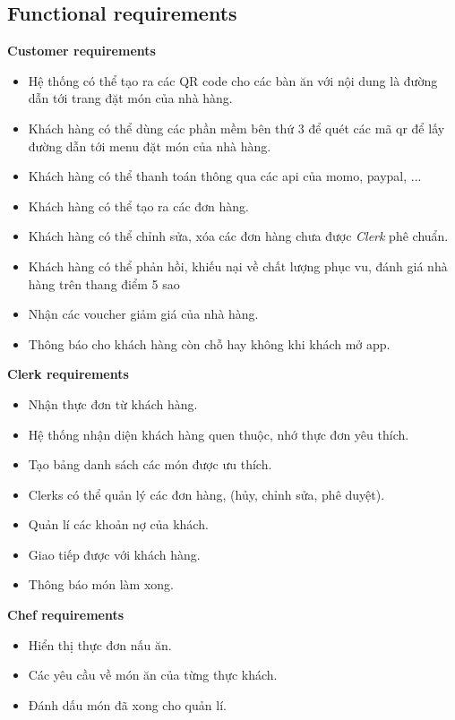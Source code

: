 \documentclass[a4paper]{article}
\begin{document}

\subsection{Functional requirements}

\textbf{Customer requirements}
\begin{itemize}

    \item Hệ thống có thể tạo ra các QR code cho các bàn ăn với nội dung là đường dẫn tới trang đặt món của nhà hàng.
    \item Khách hàng có thể dùng các phần mềm bên thứ 3 để quét các mã qr để lấy đường dẫn tới menu đặt món của nhà hàng.
    \item Khách hàng có thể thanh toán thông qua các api của momo, paypal, ...
    \item Khách hàng có thể tạo ra các đơn hàng.
    \item Khách hàng có thể chỉnh sửa, xóa các đơn hàng chưa được \textit{Clerk} phê chuẩn.
    \item Khách hàng có thể phản hồi, khiếu nại về chất lượng phục vu, đánh giá nhà hàng trên thang điểm 5 sao
    \item Nhận các voucher giảm giá của nhà hàng.
    \item Thông báo cho khách hàng còn chỗ hay không khi khách mở app.
    
\end{itemize}
\textbf{Clerk requirements}
\begin{itemize}
    \item Nhận thực đơn từ khách hàng.
    \item Hệ thống nhận diện khách hàng quen thuộc, nhớ thực đơn yêu thích.
    \item Tạo bảng danh sách các món được ưu thích.
    \item Clerks có thể quản lý các đơn hàng, (hủy, chỉnh sửa, phê duyệt).
    \item Quản lí các khoản nợ của khách.
    \item Giao tiếp được với khách hàng.
    \item Thông báo món làm xong.
\end{itemize}
\textbf{Chef requirements}
\begin{itemize}
    \item Hiển thị thực đơn nấu ăn.
    \item Các yêu cầu về món ăn của từng thực khách.
    \item Đánh dấu món đã xong cho quản lí.
\end{itemize}
\end{document}

